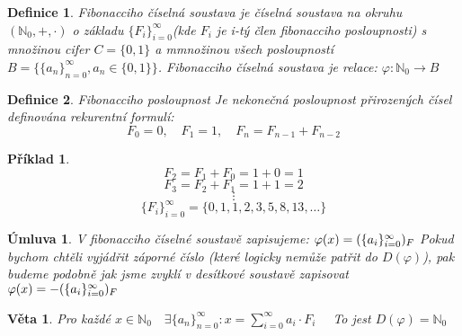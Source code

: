 \documentclass[12pt]{book}
\newtheorem{definice}{Definice}
\newtheorem{veta}{Věta}
\newtheorem*{pr}{Příklad}
\newtheorem*{umluva}{Úmluva}
\begin{document}
\begin{definice}
	Fibonacciho číselná soustava je číselná soustava na okruhu $(\mathbb{N}_0,+,\cdot)$ o základu $\{F_i\}_{i=0}^{\infty}$(kde $F_i$ je i-tý člen fibonacciho posloupnosti) s množinou cifer $C=\{0,1\}$ a mmnožinou všech posloupností
	$B=\{\{a_n\}_{n=0}^\infty,a_n \in \{0,1\} \}$.\newline
	Fibonacciho číselná soustava je relace:
	$\varphi:\mathbb{N}_0\to B$
\end{definice}
\begin{definice} Fibonacciho posloupnost\newline
	Je nekonečná posloupnost přirozených čísel definována rekurentní formulí:
	$$F_0 = 0,\quad F_1 = 1,\quad F_n = F_{n-1}+ F_{n-2}$$
\end{definice}
\begin{pr}
	$$F_2 = F_1+F_0 =  1 + 0=1$$$$F_3 = F_2+F_1 =  1 + 1= 2$$$$\vdots$$
	$$ \{F_i\}_{i=0}^{\infty} = \{0,1,1,2,3,5,8,13,\dots\}$$
\end{pr}
\begin{umluva}
	V fibonacciho číselné soustavě zapisujeme:
	$\varphi(x) =  (\{a_i\}_{i=0}^{\infty})_F$\newline
	Pokud bychom chtěli vyjádřit záporné číslo (které logicky nemůže patřit do $D(\varphi)$), pak budeme podobně jak jsme zvyklí v desítkové soustavě zapisovat $\varphi(x) = - (\{a_i\}_{i=0}^{\infty})_F$
\end{umluva}
\begin{veta}
	Pro každé $x \in \mathbb{N}_0 \quad \exists\{a_n\}_{n=0}^\infty:x=\sum_{i=0}^{\infty}a_i\cdot F_i\quad$ To jest $D(\varphi)=\mathbb{N}_0$
\end{veta}
\end{document}
